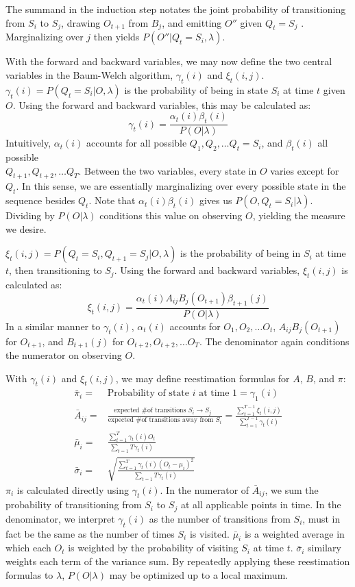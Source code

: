 The summand in the induction step notates the joint probability of transitioning from $S_i$ to $S_j$, drawing $O_{t+1}$ from $B_j$, and emitting $O''$ given $Q_t=S_j$ . Marginalizing over $j$ then yields $P(O''|Q_t=S_i, \lambda)$.

With the forward and backward variables, we may now define the two central variables in the Baum-Welch algorithm, $\gamma_t(i)$ and $\xi_t(i, j)$. $\gamma_t(i) = P(Q_t = S_i | O, \lambda)$ is the probability of being in state $S_i$ at time $t$ given $O$. Using the forward and backward variables, this may be calculated as:
\[\gamma_t(i) = \frac{\alpha_t(i)\beta_t(i)}{P(O|\lambda)}\]
Intuitively, $\alpha_t(i)$ accounts for all possible $Q_1, Q_2, \dots Q_t=S_i$, and $\beta_t(i)$ all possible \\ $Q_{t+1}, Q_{t+2}, \dots Q_T$. Between the two variables, every state in $O$ varies except for $Q_t$. In this sense, we are essentially marginalizing over every possible state in the sequence besides $Q_t$. Note that $\alpha_t(i)\beta_t(i)$ gives us $P(O, Q_t=S_i|\lambda)$. Dividing by $P(O|\lambda)$ conditions this value on observing $O$, yielding the measure we desire.

$\xi_t(i, j) = P(Q_t=S_i, Q_{t+1}=S_j|O, \lambda)$ is the probability of being in $S_i$ at time $t$, then transitioning to $S_j$. Using the forward and backward variables, $\xi_t(i, j)$ is calculated as:
\[\xi_t(i, j) = \frac{\alpha_t(i)A_{ij}B_j(O_{t+1})\beta_{t+1}(j)}{P(O|\lambda)}\]
In a similar manner to $\gamma_t(i)$, $\alpha_t(i)$ accounts for $O_1, O_2, \dots O_t$, $A_{ij}B_j(O_{t+1})$ for $O_{t+1}$, and $B_{t+1}(j)$ for $O_{t+2}, O_{t+2}, \dots O_T$. The denominator again conditions the numerator on observing $O$.

With $\gamma_t(i)$ and $\xi_t(i, j)$, we may define reestimation formulas for $A$, $B$, and $\pi$:
\begin{align*}
	\bar{\pi}_i = & \text{Probability of state $i$ at time 1} = \gamma_1(i) \\
	\bar{A}_{ij} = & \frac{\text{expected \# of transitions $S_i \rightarrow S_j$ }}{\text{expected \# of transitions away from $S_i$}} = \frac{\sum_{t=1}^{T-1}\xi_t(i,j)}{\sum_{t=1}^{T-1}\gamma_t(i)} \\
	\bar{\mu}_i = & \frac{\sum_{t=1}^{T}\gamma_t(i)O_t}{\sum_{t=1}{T}\gamma_t(i)} \\
	\bar{\sigma}_i = & \sqrt{\frac{\sum_{t=1}^{T}\gamma_t(i)(O_t-\mu_i)^2}{\sum_{t=1}{T}\gamma_t(i)}}
\end{align*}
$\pi_i$ is calculated directly using $\gamma_t(i)$. In the numerator of $\bar{A}_{ij}$, we sum the probability of transitioning from $S_i$ to $S_j$ at all applicable points in time. In the denominator, we interpret $\gamma_t(i)$ as the number of transitions from $S_i$, must in fact be the same as the number of times $S_i$ is visited. $\bar{\mu}_i$ is a weighted average in which each $O_t$ is weighted by the probability of visiting $S_i$ at time $t$. $\bar{\sigma}_i$ similary weights each term of the variance sum. By repeatedly applying these reestimation formulas to $\lambda$, $P(O|\lambda)$ may be optimized up to a local maximum.

